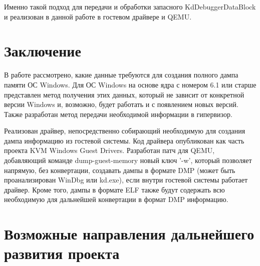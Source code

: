 \documentclass{mipt-thesis-bs}
\begin{document}
Именно такой подход для передачи и обработки запасного KdDebuggerDataBlock и реализован в данной работе в гостевом драйвере и QEMU.

\chapter{Заключение}

В работе рассмотрено, какие данные требуются для создания полного дампа памяти ОС Windows. Для ОС Windows на основе ядра с номером 6.1 или старше представлен метод получения этих данных, который не зависит от конкретной версии Windows и, возможно, будет работать и с появлением новых версий. Также разработан метод передачи необходимой информации в гипервизор.

Реализован драйвер, непосредственно собирающий необходимую для создания дампа информацию из гостевой системы. Код драйвера опубликован как часть проекта KVM Windows Guest Drivers.
Разработан патч для QEMU, добавляющий команде dump-guest-memory новый ключ '-w', который позволяет напрямую, без конвертации, создавать дампы в формате DMP (может быть проанализирован WinDbg или kd.exe), если внутри гостевой системы работает драйвер. Кроме того, дампы в формате ELF также будут содержать всю необходимую для дальнейшей конвертации в формат DMP информацию.

\chapter{Возможные направления дальнейшего развития проекта}
\end{document}
